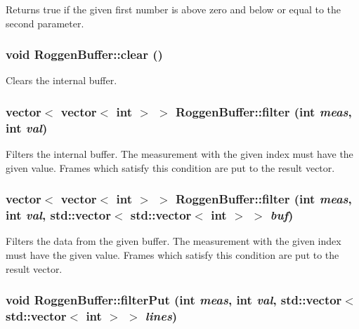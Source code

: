 \label{classRoggenBuffer_ab3ed1a78479fcfa51dbb9b4f94cceab0}
Returns true if the given first number is above zero and below or equal to the second parameter. \hypertarget{classRoggenBuffer_a199b6d0b632b4d9447a2ad85514d0872}{
\subsubsection[{clear}]{\setlength{\rightskip}{0pt plus 5cm}void RoggenBuffer::clear ()}}
\label{classRoggenBuffer_a199b6d0b632b4d9447a2ad85514d0872}
Clears the internal buffer. \hypertarget{classRoggenBuffer_ad1380e701fa8f05486c2f487e6740667}{
\subsubsection[{filter}]{\setlength{\rightskip}{0pt plus 5cm}vector$<$ vector$<$ int $>$ $>$ RoggenBuffer::filter (int {\em meas}, \/  int {\em val})}}
\label{classRoggenBuffer_ad1380e701fa8f05486c2f487e6740667}
Filters the internal buffer. The measurement with the given index must have the given value. Frames which satisfy this condition are put to the result vector. \hypertarget{classRoggenBuffer_a23c39bdb6ed6c9c34e545a1cb9c137dd}{
\subsubsection[{filter}]{\setlength{\rightskip}{0pt plus 5cm}vector$<$ vector$<$ int $>$ $>$ RoggenBuffer::filter (int {\em meas}, \/  int {\em val}, \/  std::vector$<$ std::vector$<$ int $>$ $>$ {\em buf})}}
\label{classRoggenBuffer_a23c39bdb6ed6c9c34e545a1cb9c137dd}
Filters the data from the given buffer. The measurement with the given index must have the given value. Frames which satisfy this condition are put to the result vector. \hypertarget{classRoggenBuffer_a22ac37e59b6943d9f1996a43e58af190}{
\subsubsection[{filterPut}]{\setlength{\rightskip}{0pt plus 5cm}void RoggenBuffer::filterPut (int {\em meas}, \/  int {\em val}, \/  std::vector$<$ std::vector$<$ int $>$ $>$ {\em lines})}}

